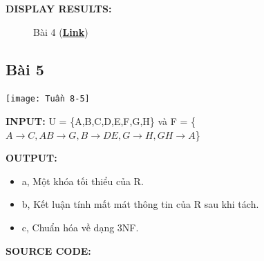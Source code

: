\documentclass[12pt,a4paper]{report}
\begin{document}
	{\bf DISPLAY RESULTS:}
		\begin{figure}[!h]
		\hfill
		\hfill
		\hfill
		\caption{Bài 4 (\href{https://drive.google.com/drive/folders/18bppOD8kB9FX16mTBPA5vzgMh5qRWkda}{\bf Link})}
		\end{figure}


\subsection{Bài 5}
	\begin{center}
		\texttt{[image: Tuần 8-5]}
	\end{center}

	{\bf INPUT:} U = \{A,B,C,D,E,F,G,H\} và F = \{$A\rightarrow C,AB\rightarrow G,B\rightarrow DE,G\rightarrow H,GH\rightarrow A$\}
	
	{\bf OUTPUT:}
	\begin{itemize}
		\item a, Một khóa tối thiểu của R.
		\item b, Kết luận tính mất mát thông tin của R sau khi tách.
		\item c, Chuẩn hóa về dạng 3NF.
	\end{itemize}
	
	{\bf SOURCE CODE:}
	
\end{document}
